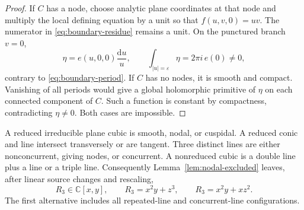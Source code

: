 \documentclass[11pt,reqno]{amsart}
\numberwithin{equation}{section}
\theoremstyle{plain}
\theoremstyle{definition}
\theoremstyle{remark}
\newcommand{\C}{\mathbb C}
\newcommand{\dd}{\mathrm d}
\begin{document}
\begin{proof}
If $C$ has a node, choose analytic plane coordinates at that node and multiply the local defining equation by a unit so that $f(u,v,0)=uv$.
The numerator in \eqref{eq:boundary-residue} remains a unit.
On the punctured branch $v=0$,
\[
\eta=e(u,0,0)\frac{\dd u}{u},
\qquad
\int_{|u|=\varepsilon}\eta=2\pi i\,e(0)\ne0,
\]
contrary to \eqref{eq:boundary-period}.
If $C$ has no nodes, it is smooth and compact. Vanishing of all periods would give a global holomorphic primitive of $\eta$ on each connected component of $C$. Such a function is constant by compactness, contradicting $\eta\ne0$.
Both cases are impossible.
\end{proof}

A reduced irreducible plane cubic is smooth, nodal, or cuspidal. A reduced conic and line intersect transversely or are tangent. Three distinct lines are either nonconcurrent, giving nodes, or concurrent. A nonreduced cubic is a double line plus a line or a triple line. Consequently Lemma~\ref{lem:nodal-excluded} leaves, after linear source changes and rescaling,
\begin{equation}\label{eq:cubic-types}
R_3\in\C[x,y],\qquad R_3=x^2y+z^3,
\qquad R_3=x^2y+xz^2.
\end{equation}
The first alternative includes all repeated-line and concurrent-line configurations.
\end{document}
